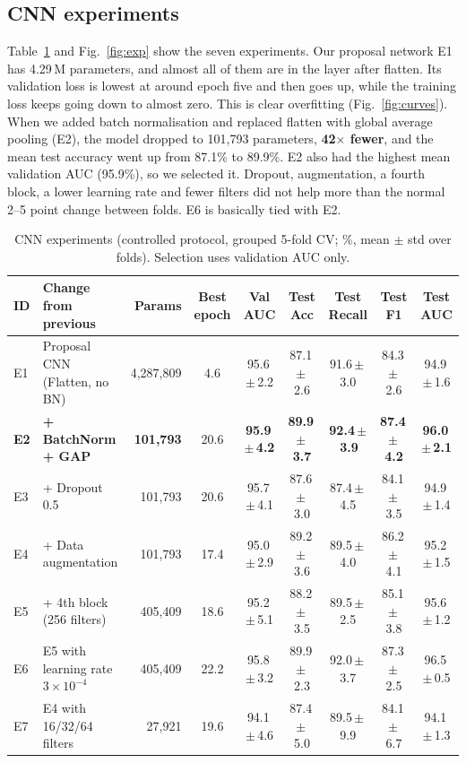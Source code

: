 \documentclass[conference]{IEEEtran}
\newcommand{\pmv}[2]{#1\,$\pm$\,#2}
\begin{document}
\subsection{CNN experiments}
Table~\ref{tab:exp} and Fig.~\ref{fig:exp} show the seven experiments. Our proposal network E1 has 4.29\,M parameters, and almost all of them are in the layer after flatten. Its validation loss is lowest at around epoch five and then goes up, while the training loss keeps going down to almost zero. This is clear overfitting (Fig.~\ref{fig:curves}). When we added batch normalisation and replaced flatten with global average pooling (E2), the model dropped to 101{,}793 parameters, \textbf{42$\times$ fewer}, and the mean test accuracy went up from 87.1\% to 89.9\%. E2 also had the highest mean validation AUC (95.9\%), so we selected it. Dropout, augmentation, a fourth block, a lower learning rate and fewer filters did not help more than the normal 2--5 point change between folds. E6 is basically tied with E2.

\begin{table}[t]
\caption{CNN experiments (controlled protocol, grouped 5-fold CV; \%, mean $\pm$ std over folds). Selection uses validation AUC only.}
\label{tab:exp}
\centering
\begin{tabular}{llrcccccc}
\toprule
ID & Change from previous & Params & Best epoch & Val AUC & Test Acc & Test Recall & Test F1 & Test AUC \\
\midrule
E1 & Proposal CNN (Flatten, no BN) & 4{,}287{,}809 & 4.6 & \pmv{95.6}{2.2} & \pmv{87.1}{2.6} & \pmv{91.6}{3.0} & \pmv{84.3}{2.6} & \pmv{94.9}{1.6} \\
\textbf{E2} & \textbf{+ BatchNorm + GAP} & \textbf{101{,}793} & 20.6 & \textbf{\pmv{95.9}{4.2}} & \textbf{\pmv{89.9}{3.7}} & \textbf{\pmv{92.4}{3.9}} & \textbf{\pmv{87.4}{4.2}} & \textbf{\pmv{96.0}{2.1}} \\
E3 & + Dropout 0.5 & 101{,}793 & 20.6 & \pmv{95.7}{4.1} & \pmv{87.6}{3.0} & \pmv{87.4}{4.5} & \pmv{84.1}{3.5} & \pmv{94.9}{1.4} \\
E4 & + Data augmentation & 101{,}793 & 17.4 & \pmv{95.0}{2.9} & \pmv{89.2}{3.6} & \pmv{89.5}{4.0} & \pmv{86.2}{4.1} & \pmv{95.2}{1.5} \\
E5 & + 4th block (256 filters) & 405{,}409 & 18.6 & \pmv{95.2}{5.1} & \pmv{88.2}{3.5} & \pmv{89.5}{2.5} & \pmv{85.1}{3.8} & \pmv{95.6}{1.2} \\
E6 & E5 with learning rate $3\!\times\!10^{-4}$ & 405{,}409 & 22.2 & \pmv{95.8}{3.2} & \pmv{89.9}{2.3} & \pmv{92.0}{3.7} & \pmv{87.3}{2.5} & \pmv{96.5}{0.5} \\
E7 & E4 with 16/32/64 filters & 27{,}921 & 19.6 & \pmv{94.1}{4.6} & \pmv{87.4}{5.0} & \pmv{89.5}{9.9} & \pmv{84.1}{6.7} & \pmv{94.1}{1.3} \\
\bottomrule
\end{tabular}
\end{table}
\end{document}
